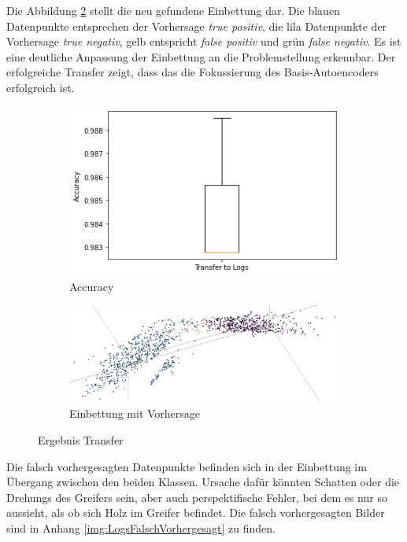 	Die Abbildung \ref{img:Einbettung_Logs_Vorhersage} stellt die neu gefundene Einbettung dar. Die blauen Datenpunkte entsprechen der Vorhersage \textit{true positiv}, die lila Datenpunkte der Vorhersage \textit{true negativ}, gelb entspricht \textit{false positiv} und grün \textit{false negativ}. Es ist eine deutliche Anpassung der Einbettung an die Problemstellung erkennbar. Der erfolgreiche Transfer zeigt, dass das die Fokussierung des Basis-Autoencoders erfolgreich ist.     
	 \begin{figure}[h]
	\centering
	\begin{subfigure}[c]{0.49\textwidth}			
		\includegraphics[width=1\textwidth,center]{bilder/Hauptteil/Transfer_Logs/Acc_Transfer_Logs.png}
		\caption{Accuracy}
		\label{img:AccuracyTransferLogs}	
	\end{subfigure}
	\begin{subfigure}[c]{0.49\textwidth}			
		\includegraphics[width=1\textwidth, center]{bilder/Hauptteil/Transfer_Logs/Logs_transfer_emb.png}
		\caption{Einbettung mit Vorhersage}
		\label{img:Einbettung_Logs_Vorhersage}	
	\end{subfigure}
	\caption{Ergebnis Transfer}
	\label{img:Ergebnis_Transfer}
\end{figure}

	Die falsch vorhergesagten Datenpunkte befinden sich in der Einbettung im Übergang zwischen den beiden Klassen.  Ursache dafür könnten Schatten oder die Drehungs des Greifers sein, aber auch perspektifische Fehler, bei dem es nur so aussieht, als ob sich Holz im Greifer befindet. Die falsch vorhergesagten Bilder sind in Anhang \ref{img:LogsFalschVorhergesagt} zu finden.
		
